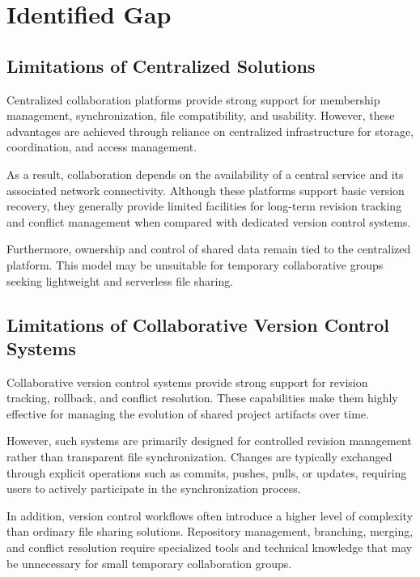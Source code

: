 \section{Identified Gap}

\subsection{Limitations of Centralized Solutions}

Centralized collaboration platforms provide strong support for
membership management, synchronization, file compatibility,
and usability. However, these advantages are achieved through
reliance on centralized infrastructure for storage,
coordination, and access management.

As a result, collaboration depends on the availability of a
central service and its associated network connectivity.
Although these platforms support basic version recovery, they
generally provide limited facilities for long-term revision
tracking and conflict management when compared with dedicated
version control systems.

Furthermore, ownership and control of shared data remain tied
to the centralized platform. This model may be unsuitable for
temporary collaborative groups seeking lightweight and
serverless file sharing.

\subsection{Limitations of Collaborative Version Control Systems}

Collaborative version control systems provide strong support
for revision tracking, rollback, and conflict resolution.
These capabilities make them highly effective for managing the
evolution of shared project artifacts over time.

However, such systems are primarily designed for controlled
revision management rather than transparent file
synchronization. Changes are typically exchanged through
explicit operations such as commits, pushes, pulls, or
updates, requiring users to actively participate in the
synchronization process.

In addition, version control workflows often introduce a
higher level of complexity than ordinary file sharing
solutions. Repository management, branching, merging, and
conflict resolution require specialized tools and technical
knowledge that may be unnecessary for small temporary
collaboration groups.

